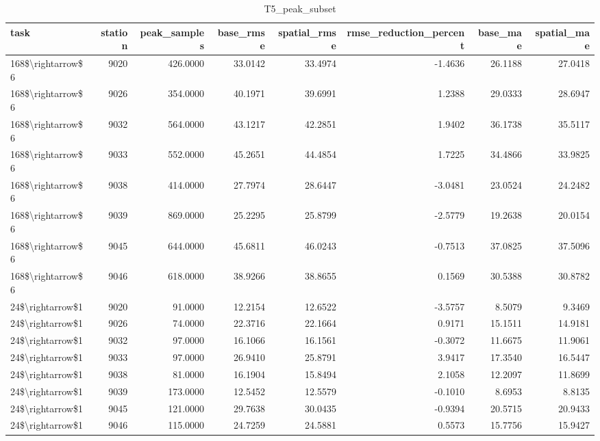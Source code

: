 \begin{table}
\caption{T5_peak_subset}
\label{tab:T5_peak_subset}
\begin{tabular}{lrrrrrrr}
\toprule
task & station & peak\_samples & base\_rmse & spatial\_rmse & rmse\_reduction\_percent & base\_mae & spatial\_mae \\
\midrule
168\$\textbackslash rightarrow\$6 & 9020 & 426.0000 & 33.0142 & 33.4974 & -1.4636 & 26.1188 & 27.0418 \\
168\$\textbackslash rightarrow\$6 & 9026 & 354.0000 & 40.1971 & 39.6991 & 1.2388 & 29.0333 & 28.6947 \\
168\$\textbackslash rightarrow\$6 & 9032 & 564.0000 & 43.1217 & 42.2851 & 1.9402 & 36.1738 & 35.5117 \\
168\$\textbackslash rightarrow\$6 & 9033 & 552.0000 & 45.2651 & 44.4854 & 1.7225 & 34.4866 & 33.9825 \\
168\$\textbackslash rightarrow\$6 & 9038 & 414.0000 & 27.7974 & 28.6447 & -3.0481 & 23.0524 & 24.2482 \\
168\$\textbackslash rightarrow\$6 & 9039 & 869.0000 & 25.2295 & 25.8799 & -2.5779 & 19.2638 & 20.0154 \\
168\$\textbackslash rightarrow\$6 & 9045 & 644.0000 & 45.6811 & 46.0243 & -0.7513 & 37.0825 & 37.5096 \\
168\$\textbackslash rightarrow\$6 & 9046 & 618.0000 & 38.9266 & 38.8655 & 0.1569 & 30.5388 & 30.8782 \\
24\$\textbackslash rightarrow\$1 & 9020 & 91.0000 & 12.2154 & 12.6522 & -3.5757 & 8.5079 & 9.3469 \\
24\$\textbackslash rightarrow\$1 & 9026 & 74.0000 & 22.3716 & 22.1664 & 0.9171 & 15.1511 & 14.9181 \\
24\$\textbackslash rightarrow\$1 & 9032 & 97.0000 & 16.1066 & 16.1561 & -0.3072 & 11.6675 & 11.9061 \\
24\$\textbackslash rightarrow\$1 & 9033 & 97.0000 & 26.9410 & 25.8791 & 3.9417 & 17.3540 & 16.5447 \\
24\$\textbackslash rightarrow\$1 & 9038 & 81.0000 & 16.1904 & 15.8494 & 2.1058 & 12.2097 & 11.8699 \\
24\$\textbackslash rightarrow\$1 & 9039 & 173.0000 & 12.5452 & 12.5579 & -0.1010 & 8.6953 & 8.8135 \\
24\$\textbackslash rightarrow\$1 & 9045 & 121.0000 & 29.7638 & 30.0435 & -0.9394 & 20.5715 & 20.9433 \\
24\$\textbackslash rightarrow\$1 & 9046 & 115.0000 & 24.7259 & 24.5881 & 0.5573 & 15.7756 & 15.9427 \\
\bottomrule
\end{tabular}
\end{table}
